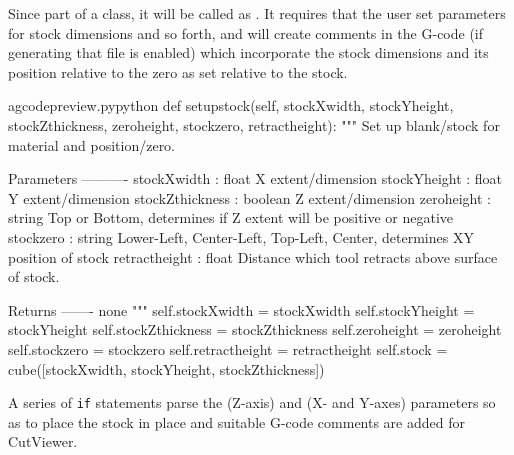 \documentclass{ltxdoc}
\begin{document}
Since part of a class, it will be called as . It requires that the user set parameters for stock dimensions and so forth, and will create comments in the G-code (if generating that file is enabled) which incorporate the stock dimensions and its position relative to the zero as set relative to the stock.

\lstset{firstnumber=\thegcpy}
\begin{writecode}{a}{gcodepreview.py}{python}
    def setupstock(self, stockXwidth,
                 stockYheight,
                 stockZthickness,
                 zeroheight,
                 stockzero,
                 retractheight):
        """
        Set up blank/stock for material and position/zero.
        
        Parameters
        ----------
        stockXwidth :   float
                        X extent/dimension
        stockYheight :  float
                        Y extent/dimension
        stockZthickness : boolean
                        Z extent/dimension
        zeroheight :    string
                        Top or Bottom, determines if Z extent will be positive or negative
        stockzero :     string
                        Lower-Left, Center-Left, Top-Left, Center, determines XY position of stock 
        retractheight : float
                        Distance which tool retracts above surface of stock.
        
        Returns
        -------
        none
        """
        self.stockXwidth = stockXwidth
        self.stockYheight = stockYheight
        self.stockZthickness = stockZthickness
        self.zeroheight = zeroheight
        self.stockzero = stockzero
        self.retractheight = retractheight 
        self.stock = cube([stockXwidth, stockYheight, stockZthickness]) 

\end{writecode}
\addtocounter{gcpy}{36}

A series of \verb|if| statements parse the  (Z-axis) and  (X- and Y-axes) parameters so as to place the stock in place and suitable G-code comments are added for CutViewer.
\end{document}

